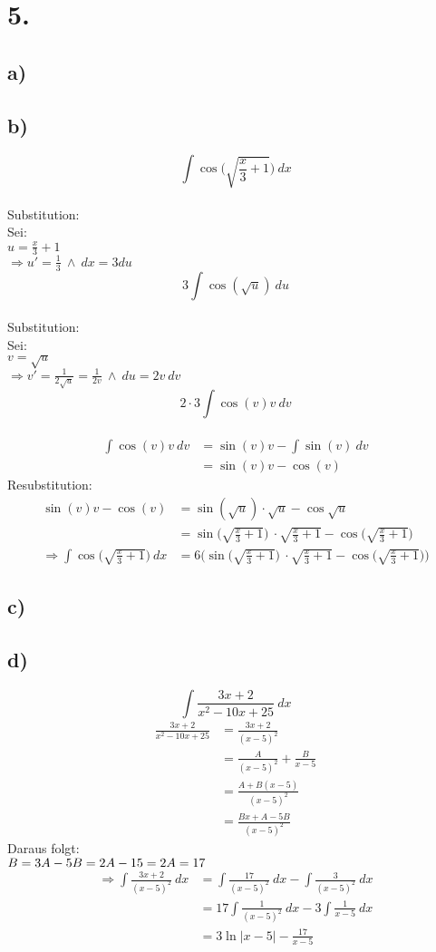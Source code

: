\documentclass[a4paper]{scrartcl}
\begin{document}
\newpage
\section{5.}
\subsection{a)}
\subsection{b)}
\[\int\cos\Big(\sqrt{\frac{x}{3}+1}\Big)\ dx\]\\
Substitution:\\
Sei:\\
\(u=\frac{x}{3}+1\)\\
\(\Rightarrow u'=\frac{1}{3}\ \land \ dx=3du\)\\
\[3\int\cos(\sqrt{u})\ du\]\\
Substitution:\\
Sei:\\
\(v=\sqrt{u}\)\\
\(\Rightarrow v'=\frac{1}{2\sqrt{u}}=\frac{1}{2v}\ \land \ du=2v\ dv\)\\
\[2\cdot 3\int\cos(v)v\ dv\]\\
\begin{align}
\int\cos(v)v\ dv&=\sin(v)v-\int\sin(v)\ dv\\
	&=\sin(v)v-\cos(v)
\end{align}
Resubstitution:
\begin{align}
\sin(v)v-\cos(v)&=\sin(\sqrt{u})\cdot\sqrt{u}-\cos\sqrt{u}\\
	&=\sin\Big(\sqrt{\frac{x}{3}+1}\Big)\ \cdot\sqrt{\frac{x}{3}+1}-\cos\Big(\sqrt{\frac{x}{3}+1}\Big)\\
	\Rightarrow \int\cos\Big(\sqrt{\frac{x}{3}+1}\Big)\ dx &=6\Bigg(\sin\Big(\sqrt{\frac{x}{3}+1}\Big)\ \cdot\sqrt{\frac{x}{3}+1}-\cos\Big(\sqrt{\frac{x}{3}+1}\Big)\Bigg)
\end{align}
\subsection{c)}
\subsection{d)}
\[\int\frac{3x+2}{x^2-10x+25}\ dx\]
\begin{align}
\frac{3x+2}{x^2-10x+25}&=\frac{3x+2}{(x-5)^2}\\
	&=\frac{A}{(x-5)^2}+\frac{B}{x-5}\\
	&=\frac{A+B(x-5)}{(x-5)^2}\\
	&=\frac{Bx+A-5B}{(x-5)^2}
\end{align}
Daraus folgt:\\
\(B=3\\
A-5B=2\\
A-15=2\\
A=17\)
\begin{align}
\Rightarrow\int\frac{3x+2}{(x-5)^2}\ dx&=\int\frac{17}{(x-5)^2}\ dx-\int\frac{3}{(x-5)^2}\ dx\\
	&=17\int\frac{1}{(x-5)^2}\ dx-3\int\frac{1}{x-5}\ dx\\
	&=3\ln |x-5|-\frac{17}{x-5}
\end{align}
\end{document}

